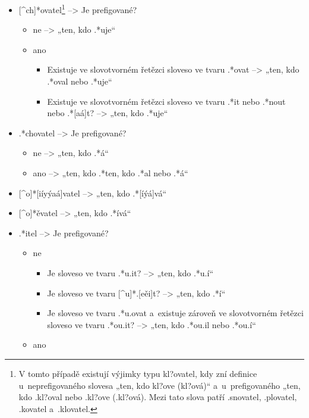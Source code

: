 \begin{itemize}
\tightlist
\item
  {[}\^{}ch{]}*ovatel\footnote{V tomto případě existují výjimky typu kl?ovatel, kdy zní definice u~neprefigovaného slovesa „ten, kdo kl?ove (kl?ová)“ a~u~prefigovaného „ten, kdo .\*kl?oval nebo .\*kl?ove (.\*kl?ová). Mezi tato slova patří .\*snovatel, .\*plovatel, .\*kovatel a~.\*klovatel.}
  --\textgreater{} Je prefigované?

  \begin{itemize}
  \tightlist
  \item
    ne --\textgreater{} „ten, kdo .*uje``
  \item
    ano

    \begin{itemize}
    \tightlist
    \item
      Existuje ve slovotvorném řetězci sloveso ve tvaru .*ovat
      --\textgreater{} „ten, kdo .*oval nebo .*uje``
    \item
      Existuje ve slovotvorném řetězci sloveso ve tvaru .*it nebo .*nout
      nebo .*{[}aá{]}t? --\textgreater{} „ten, kdo .*uje``
    \end{itemize}
  \end{itemize}
\item
  .*chovatel --\textgreater{} Je prefigované?

  \begin{itemize}
  \tightlist
  \item
    ne --\textgreater{} „ten, kdo .*á``
  \item
    ano --\textgreater{} „ten, kdo .*ten, kdo .*al nebo .*á``
  \end{itemize}
\item
  {[}\^{}o{]}*{[}iíyýaá{]}vatel --\textgreater{} „ten, kdo
  .*{[}íýá{]}vá``
\item
  {[}\^{}o{]}*ěvatel --\textgreater{} „ten, kdo .*ívá``
\item
  .*itel --\textgreater{} Je prefigované?

  \begin{itemize}
  \tightlist
  \item
    ne

    \begin{itemize}
    \tightlist
    \item
      Je sloveso ve tvaru .*u.it? --\textgreater{} „ten, kdo .*u.í``
    \item
      Je sloveso ve tvaru {[}\^{}u{]}*.{[}eěi{]}t? --\textgreater{}
      „ten, kdo .*í``
    \item
      Je sloveso ve tvaru .*u.ovat a~existuje zároveň ve slovotvorném
      řetězci sloveso ve tvaru .*ou.it? --\textgreater{} „ten, kdo
      .*ou.il nebo .*ou.í``
    \end{itemize}
  \item
    ano


\end{itemize}
\end{itemize}
